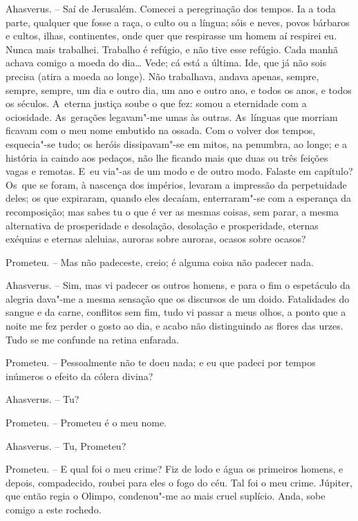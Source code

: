 Ahasverus. -- Saí de Jerusalém. Comecei a peregrinação dos tempos. Ia a
toda parte, qualquer que fosse a raça, o culto ou a língua; sóis e
neves, povos bárbaros e cultos, ilhas, continentes, onde quer que
respirasse um homem aí respirei eu. Nunca mais trabalhei. Trabalho é
refúgio, e não tive esse refúgio. Cada manhã achava comigo a moeda do
dia\ldots{} Vede; cá está a última. Ide, que já não sois precisa (atira a
moeda ao longe). Não trabalhava, andava apenas, sempre, sempre, sempre,
um dia e outro dia, um ano e outro ano, e todos os anos, e todos os
séculos. A~eterna justiça soube o que fez: somou a eternidade com a
ociosidade. As~gerações legavam"-me umas às outras. As~línguas que
morriam ficavam com o meu nome embutido na ossada. Com o volver dos
tempos, esquecia"-se tudo; os heróis dissipavam"-se em mitos, na penumbra,
ao longe; e a história ia caindo aos pedaços, não lhe ficando mais que
duas ou três feições vagas e remotas. E~eu via"-as de um modo e de outro
modo. Falaste em capítulo? Os~que se foram, à nascença dos impérios,
levaram a impressão da perpetuidade deles; os que expiraram, quando eles
decaíam, enterraram"-se com a esperança da recomposição; mas sabes tu o
que é ver as mesmas coisas, sem parar, a mesma alternativa de
prosperidade e desolação, desolação e prosperidade, eternas exéquias e
eternas aleluias, auroras sobre auroras, ocasos sobre ocasos?

Prometeu. -- Mas não padeceste, creio; é alguma coisa não padecer nada.

Ahasverus. -- Sim, mas vi padecer os outros homens, e para o fim o
espetáculo da alegria dava"-me a mesma sensação que os discursos de um
doido. Fatalidades do sangue e da carne, conflitos sem fim, tudo vi
passar a meus olhos, a ponto que a noite me fez perder o gosto ao dia, e
acabo não distinguindo as flores das urzes. Tudo se me confunde na
retina enfarada.

Prometeu. -- Pessoalmente não te doeu nada; e eu que padeci por tempos
inúmeros o efeito da cólera divina?

Ahasverus. -- Tu?

Prometeu. -- Prometeu é o meu nome.

Ahasverus. -- Tu, Prometeu?

Prometeu. -- E qual foi o meu crime? Fiz de lodo e água os primeiros
homens, e depois, compadecido, roubei para eles o fogo do céu. Tal foi o
meu crime. Júpiter, que então regia o Olimpo, condenou"-me ao mais cruel
suplício. Anda, sobe comigo a este rochedo.

